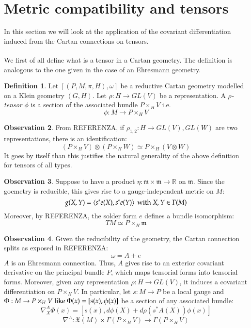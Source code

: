 \documentclass[12pt,a4paper]{report}
\theoremstyle{definition}
\newtheorem{Def}{Definition}[chapter]
\theoremstyle{Theorem}
\theoremstyle{break}
\theoremstyle{definition}
\newtheorem{Obs}[Def]{Observation}
\begin{document}
	\section{Metric compatibility and tensors}
	In this section we will look at the application of the covariant differentiation induced from the Cartan connections on tensors.\\
	\\
	We first of all define what is a tensor in a Cartan geometry. The definition is analogous to the one given in the case of an Ehresmann geometry.
	\begin{Def}
		Let $[(P,M,\pi,H),\omega]$ be a reductive Cartan geometry modelled on a Klein geometry $(G,H)$. Let $\rho:H\rightarrow GL(V)$ be a representation. A \textit{$\rho$-tensor} $\phi$ is a section of the associated bundle $P\times_H V$ i.e.
		$$\phi:M\rightarrow P\times_H V$$ 
	\end{Def}
	\begin{Obs}
		From REFERENZA, if $\rho_{1,2}:H\rightarrow GL(V),GL(W)$ are two representations, there is an identification:
		$$(P\times_H V)\otimes (P\times_H W)\simeq P\times_H(V\otimes W)$$
		It goes by itself than this justifies the natural generality of the above definition for tensors of all types.
	\end{Obs}
		\begin{Obs}
		Suppose to have a product $\eta:\mathfrak{m}\times \mathfrak{m}\rightarrow \mathbb{R}$ on $\mathfrak{m}$. Since the goemetry is reducible, this gives rise to a gauge-independent metric on $M$:
		$$g(X,Y)=\braket{s^*e(X),s^*e(Y)}\hbox{ with }X,Y\in\Gamma(M)$$
		Moreover, by REFERENZA, the solder form $e$ defines a bundle isomorphism:
		$$TM\simeq P\times_H \mathfrak{m}$$
	\end{Obs}
	\begin{Obs}
		Given the reducibility of the geometry, the Cartan connection splits as exposed in REFERENZA:
		$$\omega=A+e$$
		$A$ is an Ehresmann connection. Thus, $A$ gives rise to an exterior covariant derivative on the principal bundle $P$, which maps tensorial forms into tensorial forms. Moreover, given any representation $\rho:H\rightarrow GL(V)$, it induces a covariant differentiation on $P\times_H V$. In particular, let $s:M\rightarrow P$ be a local gauge and $\Phi:M\rightarrow P\times_H V\hbox{ like }\Phi(x)=[s(x),\phi(x)]$ be a section of any associated bundle: 
		$$\nabla^A_X \Phi(x)=[s(x),d\phi(X)+d\rho(s^*A(X))\phi(x)]$$
		$$\nabla^A:\mathfrak{X}(M)\times\Gamma(P\times_H V)\rightarrow \Gamma(P\times_H V)$$
	\end{Obs}
\end{document}
